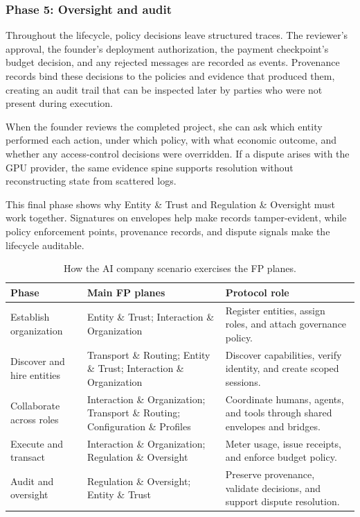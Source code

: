 \documentclass{llmxive}
\begin{document}
\subsubsection{Phase 5: Oversight and audit}

Throughout the lifecycle, policy decisions leave structured traces. The reviewer's approval, the founder's deployment authorization, the payment checkpoint's budget decision, and any rejected messages are recorded as events. Provenance records bind these decisions to the policies and evidence that produced them, creating an audit trail that can be inspected later by parties who were not present during execution.

When the founder reviews the completed project, she can ask which entity performed each action, under which policy, with what economic outcome, and whether any access-control decisions were overridden. If a dispute arises with the GPU provider, the same evidence spine supports resolution without reconstructing state from scattered logs.

This final phase shows why Entity \& Trust and Regulation \& Oversight must work together. Signatures on envelopes help make records tamper-evident, while policy enforcement points, provenance records, and dispute signals make the lifecycle auditable.

\begin{table}[!ht]
\centering
\footnotesize
\begin{tabular}{@{}p{} p{} p{}@{}}
\toprule
\textbf{Phase} & \textbf{Main FP planes} & \textbf{Protocol role} \\
\midrule
Establish organization & Entity \& Trust; Interaction \& Organization & Register entities, assign roles, and attach governance policy. \\
Discover and hire entities & Transport \& Routing; Entity \& Trust; Interaction \& Organization & Discover capabilities, verify identity, and create scoped sessions. \\
Collaborate across roles & Interaction \& Organization; Transport \& Routing; Configuration \& Profiles & Coordinate humans, agents, and tools through shared envelopes and bridges. \\
Execute and transact & Interaction \& Organization; Regulation \& Oversight & Meter usage, issue receipts, and enforce budget policy. \\
Audit and oversight & Regulation \& Oversight; Entity \& Trust & Preserve provenance, validate decisions, and support dispute resolution. \\
\bottomrule
\end{tabular}
\caption{How the AI company scenario exercises the FP planes.}
\label{tab:scenario-planes}
\end{table}
\end{document}
